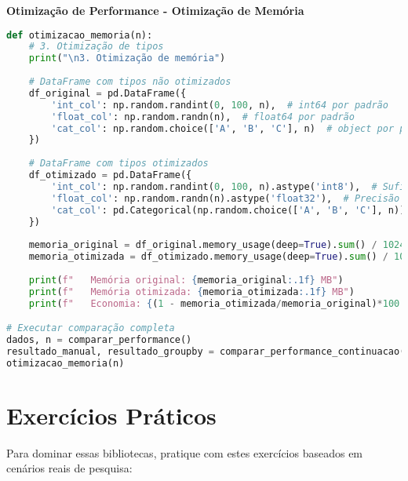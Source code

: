 \begin{examplebox}
\textbf{Otimização de Performance - Otimização de Memória}

\begin{lstlisting}[language=Python]
def otimizacao_memoria(n):
    # 3. Otimização de tipos
    print("\n3. Otimização de memória")
    
    # DataFrame com tipos não otimizados
    df_original = pd.DataFrame({
        'int_col': np.random.randint(0, 100, n),  # int64 por padrão
        'float_col': np.random.randn(n),  # float64 por padrão
        'cat_col': np.random.choice(['A', 'B', 'C'], n)  # object por padrão
    })
    
    # DataFrame com tipos otimizados
    df_otimizado = pd.DataFrame({
        'int_col': np.random.randint(0, 100, n).astype('int8'),  # Suficiente para 0-100
        'float_col': np.random.randn(n).astype('float32'),  # Precisão suficiente
        'cat_col': pd.Categorical(np.random.choice(['A', 'B', 'C'], n))  # Categórico
    })
    
    memoria_original = df_original.memory_usage(deep=True).sum() / 1024**2
    memoria_otimizada = df_otimizado.memory_usage(deep=True).sum() / 1024**2
    
    print(f"   Memória original: {memoria_original:.1f} MB")
    print(f"   Memória otimizada: {memoria_otimizada:.1f} MB")
    print(f"   Economia: {(1 - memoria_otimizada/memoria_original)*100:.1f}%")

# Executar comparação completa
dados, n = comparar_performance()
resultado_manual, resultado_groupby = comparar_performance_continuacao(dados)
otimizacao_memoria(n)
\end{lstlisting}
\end{examplebox}

\section{Exercícios Práticos}

Para dominar essas bibliotecas, pratique com estes exercícios baseados em cenários reais de pesquisa:

